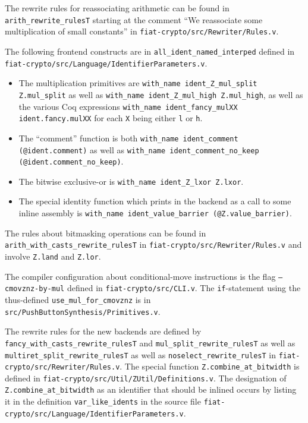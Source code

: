 \documentclass[a4paper,USenglish,cleveref,autoref,thm-restate]{lipics-v2021}
\begin{document}
\begin{minipage}[t][1cm]{\textwidth}
The rewrite rules
for reassociating arithmetic
can be found in \texttt{arith_rewrite_rulesT} starting at the comment ``We reassociate some multiplication of small constants'' in \texttt{fiat-crypto/src/Rewriter/Rules.v}.

The
following
frontend constructs
are in \verb|all_ident_named_interped| defined in \texttt{fiat-crypto/src/Language/IdentifierParameters.v}.
\begin{itemize}
\item
  The multiplication primitives are \texttt{with_name ident_Z_mul_split Z.mul_split} as well as \texttt{with_name ident_Z_mul_high Z.mul_high}, as well as the various Coq expressions \texttt{with_name ident_fancy_mulXX ident.fancy.mulXX} for each \texttt{X} being either \texttt{l} or \texttt{h}.
\item
  The ``comment'' function is both \texttt{with_name ident_comment (@ident.comment)} as well as \texttt{with_name ident_comment_no_keep (@ident.comment_no_keep)}.
\item
  The bitwise exclusive-or is \texttt{with_name ident_Z_lxor Z.lxor}.
\item
  The special identity function which prints in the backend as a call to some inline assembly is \texttt{with_name ident_value_barrier (@Z.value_barrier)}.
\end{itemize}

The rules about bitmasking operations
can be found in \texttt{arith_with_casts_rewrite_rulesT} in \texttt{fiat-crypto/src/Rewriter/Rules.v} and involve \texttt{Z.land} and \texttt{Z.lor}.

The compiler configuration about conditional-move instructions is the flag \texttt{--cmovznz-by-mul} defined in \texttt{fiat-crypto/src/CLI.v}.
The \texttt{if}-statement using the thus-defined \texttt{use_mul_for_cmovznz} is in \texttt{src/PushButtonSynthesis/Primitives.v}.

The rewrite rules for the new backends
are defined by \texttt{fancy_with_casts_rewrite_rulesT} and \texttt{mul_split_rewrite_rulesT} as well as \texttt{multiret_split_rewrite_rulesT} as well as \texttt{noselect_rewrite_rulesT} in \texttt{fiat-crypto/src/Rewriter/Rules.v}.
The special function \texttt{Z.combine_at_bitwidth} is defined in \texttt{fiat-crypto/src/Util/ZUtil/Definitions.v}.
The designation of \texttt{Z.combine_at_bitwidth} as an identifier that should be inlined occurs by listing it in the definition \texttt{var_like_idents} in the source file \texttt{fiat-crypto/src/Language/IdentifierParameters.v}.


\end{minipage}
\end{document}
